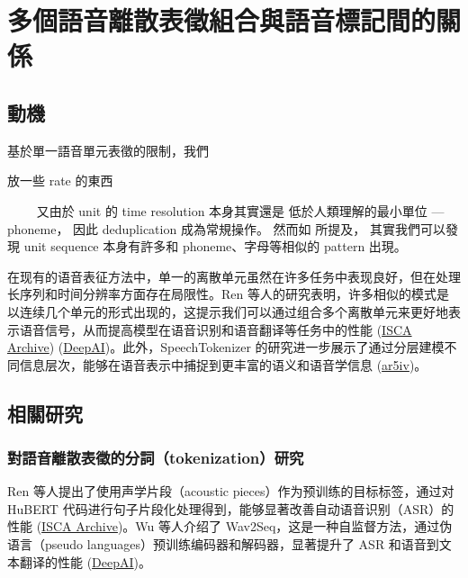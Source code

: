 


\chapter{多個語音離散表徵組合與語音標記間的關係}
\section{動機}

基於單一語音單元表徵的限制，我們

放一些 rate 的東西

　　
又由於 unit 的 time resolution 本身其實還是
低於人類理解的最小單位 --- phoneme，
因此 deduplication 成為常規操作。
然而如
 所提及，
其實我們可以發現
unit sequence 本身有許多和 phoneme、字母等相似的 pattern 出現。



在现有的语音表征方法中，单一的离散单元虽然在许多任务中表现良好，但在处理长序列和时间分辨率方面存在局限性。Ren 等人的研究表明，许多相似的模式是以连续几个单元的形式出现的，这提示我们可以通过组合多个离散单元来更好地表示语音信号，从而提高模型在语音识别和语音翻译等任务中的性能 (\href{https://www.isca-archive.org/interspeech_2022/ren22_interspeech.html}{ISCA Archive}) (\href{https://deepai.org/publication/speech-pre-training-with-acoustic-piece}{DeepAI})。此外，SpeechTokenizer 的研究进一步展示了通过分层建模不同信息层次，能够在语音表示中捕捉到更丰富的语义和语音学信息 (\href{https://ar5iv.org/pdf/2308.16692}{ar5iv})。 


\section{相關研究}

\subsection{對語音離散表徵的分詞（tokenization）研究}

Ren 等人提出了使用声学片段（acoustic pieces）作为预训练的目标标签，通过对 HuBERT 代码进行句子片段化处理得到，能够显著改善自动语音识别（ASR）的性能 (\href{https://www.isca-archive.org/interspeech_2022/ren22_interspeech.html}{ISCA Archive})。Wu 等人介绍了 Wav2Seq，这是一种自监督方法，通过伪语言（pseudo languages）预训练编码器和解码器，显著提升了 ASR 和语音到文本翻译的性能 (\href{https://deepai.org/publication/speech-pre-training-with-acoustic-piece}{DeepAI})。

